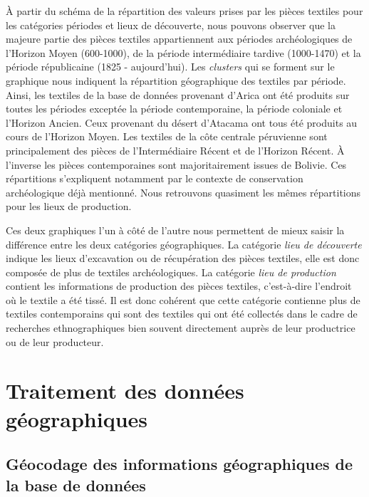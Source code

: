 À partir du schéma de la répartition des valeurs prises par les pièces textiles pour les catégories périodes et lieux de découverte, nous pouvons observer que la majeure partie des pièces textiles appartiennent aux périodes archéologiques de l'Horizon Moyen (600-1000), de la période intermédiaire tardive (1000-1470) et la période républicaine (1825 - aujourd'hui). Les \textit{clusters} qui se forment sur le graphique nous indiquent la répartition géographique des textiles par période. Ainsi, les textiles de la base de données provenant d'Arica ont été produits sur toutes les périodes exceptée la période contemporaine, la période coloniale et l'Horizon Ancien.
Ceux provenant du désert d'Atacama ont tous été produits au cours de l'Horizon Moyen. Les textiles de la côte centrale péruvienne sont principalement des pièces de l'Intermédiaire Récent et de l'Horizon Récent.
À l'inverse les pièces contemporaines sont majoritairement issues de Bolivie. Ces répartitions s'expliquent notamment par le contexte de conservation archéologique déjà mentionné. Nous retrouvons quasiment les mêmes répartitions pour les lieux de production.

Ces deux graphiques l'un à côté de l'autre nous permettent de mieux saisir la différence entre les deux catégories géographiques. La catégorie \textit{lieu de découverte} indique les lieux d'excavation ou de récupération des pièces textiles, elle est donc composée de plus de textiles archéologiques.
La catégorie \textit{lieu de production} contient les informations de production des pièces textiles, c'est-à-dire l'endroit où le textile a été tissé. Il est donc cohérent que cette catégorie contienne plus de textiles contemporains qui sont des textiles qui ont été collectés dans le cadre de recherches ethnographiques bien souvent directement auprès de leur productrice ou de leur producteur.



\section{Traitement des données géographiques}
\subsection{Géocodage des informations géographiques de la base de données}

